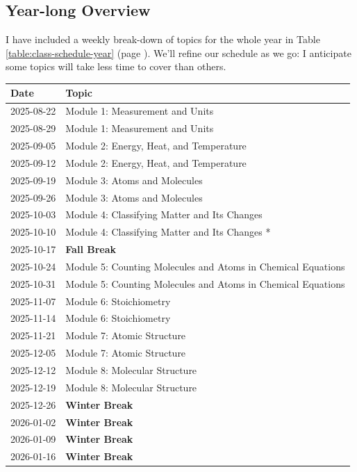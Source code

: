 \documentclass[11pt, oneside]{article}   	%
\begin{document}
\subsection*{Year-long Overview}
I have included a weekly break-down of topics for the whole year in Table \ref{table:class-schedule-year} (page \pageref{table:class-schedule-year} ).
We'll refine our schedule as we go: I anticipate some topics will take less time to cover than others.

\begin{table}[h]
\centering
\begin{tabular}{ l | l }
Date & Topic \\
\hline
2025-08-22 & Module 1:  Measurement and Units \\
2025-08-29 & Module 1:  Measurement and Units \\
2025-09-05 & Module 2: Energy, Heat, and Temperature \\
2025-09-12 & Module 2: Energy, Heat, and Temperature \\
2025-09-19 & Module 3: Atoms and Molecules \\
2025-09-26 & Module 3: Atoms and Molecules \\
2025-10-03 & Module 4: Classifying Matter and Its Changes \\
2025-10-10 & Module 4: Classifying Matter and Its Changes * \\

2025-10-17 & \textbf{Fall Break} \\

2025-10-24 & Module 5: Counting Molecules and Atoms in Chemical Equations \\
2025-10-31 & Module 5: Counting Molecules and Atoms in Chemical Equations \\
2025-11-07 & Module 6: Stoichiometry \\
2025-11-14 & Module 6: Stoichiometry \\
2025-11-21 & Module 7: Atomic Structure \\
2025-12-05 & Module 7: Atomic Structure \\
2025-12-12 & Module 8: Molecular Structure \\
2025-12-19 & Module 8: Molecular Structure \\

2025-12-26  & \textbf{Winter Break} \\
2026-01-02  & \textbf{Winter Break} \\
2026-01-09  & \textbf{Winter Break} \\
2026-01-16  & \textbf{Winter Break} \\


\end{tabular}
\end{table}
\end{document}
